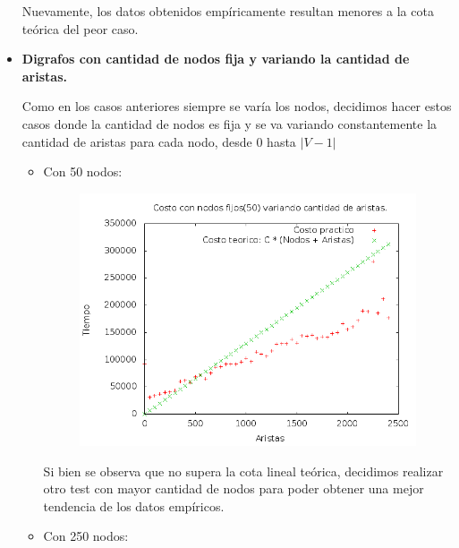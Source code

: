\begin{itemize}
\quad Nuevamente, los datos obtenidos empíricamente resultan menores a la cota teórica del peor caso.

\item  \textbf{Digrafos con cantidad de nodos fija y variando la cantidad de aristas.}

\quad Como en los casos anteriores siempre se varía los nodos, decidimos hacer estos casos donde la cantidad de nodos es fija y se va variando constantemente la cantidad de aristas para cada nodo, desde 0 hasta $ \vert V - 1 \vert $

\begin{itemize}

\item Con 50 nodos:

\begin{figure}[H]
	\centering
	\includegraphics[scale=0.6]{ej3-grafico1.png}
\end{figure}

\quad Si bien se observa que no supera la cota lineal teórica, decidimos realizar otro test con mayor cantidad de nodos para poder obtener una mejor tendencia de los datos empíricos.

\item Con 250 nodos:


\end{itemize}
\end{itemize}

